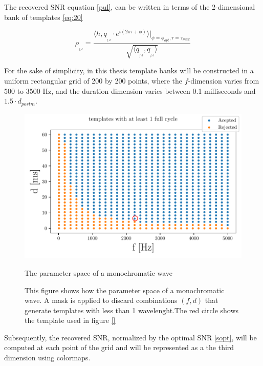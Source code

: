 The recovered SNR equation \ref{pul}, can be written in terms of the 2-dimensional bank of templates \ref{eq:20}

\begin{equation}\label{eq:21}
\rho_{_{_{f,d}}} = \frac{\langle h, q_{_{_{f,d}}}\cdot e^{i(2\pi \tau+\phi)}\rangle \bigg\rvert_{\phi =\phi_{opt},\tau =\tau_{max}}}{\sqrt{\langle  q_{_{_{f,d}}},q_{_{_{f,d}}} \rangle}}
\end{equation}


For the sake of simplicity, in this thesis template banks will be constructed in a uniform rectangular grid of 200 by 200 points, where the $f$-dimension varies from 500 to 3500 Hz, and the duration dimension varies between 0.1 milliseconds and $1.5 \cdot d_{postm}$. 

\begin{figure}[!htb]
\centering
\includegraphics[scale=0.55]{images/Data_analysis/results/param_space.pdf}
\captionsetup{width=0.8\textwidth}
\caption{The parameter space of a monochromatic wave}
\caption*{This figure shows how the parameter space of a monochromatic wave. A mask is applied to discard combinations $(f,d)$ that generate templates with less than 1 wavelenght.The red circle shows the template used in figure \ref{}}
\end{figure}
\FloatBarrier


Subsequently, the recovered SNR, normalized by the optimal SNR \ref{sopt}, will be computed at each point of the grid and will be represented as a the third dimension using colormaps. 


